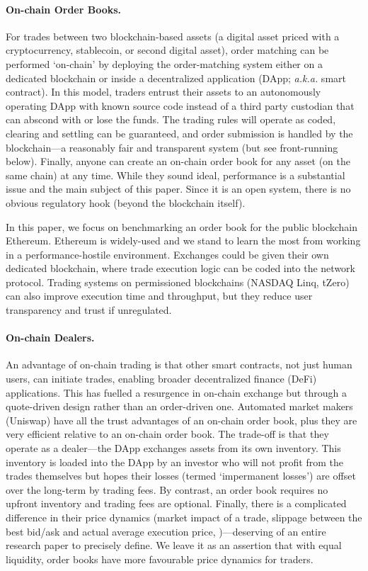 \paragraph{On-chain Order Books.} For trades between two blockchain-based assets (\eg a digital asset priced with a cryptocurrency, stablecoin, or second digital asset), order matching can be performed `on-chain' by deploying the order-matching system either on a dedicated blockchain or inside a decentralized application (DApp; \textit{a.k.a.} smart contract). In this model, traders entrust their assets to an autonomously operating DApp with known source code instead of a third party custodian that can abscond with or lose the funds. The trading rules will operate as coded, clearing and settling can be guaranteed, and order submission is handled by the blockchain---a reasonably fair and transparent system (but see front-running below). Finally, anyone can create an on-chain order book for any asset (on the same chain) at any time. While they sound ideal, performance is a substantial issue and the main subject of this paper. Since it is an open system, there is no obvious regulatory hook (beyond the blockchain itself). 

In this paper, we focus on benchmarking an order book for the public blockchain Ethereum. Ethereum is widely-used and we stand to learn the most from working in a performance-hostile environment. Exchanges could be given their own dedicated blockchain, where trade execution logic can be coded into the network protocol. Trading systems on permissioned blockchains (\eg NASDAQ Linq, tZero) can also improve execution time and throughput, but they reduce user transparency and trust if unregulated.

\paragraph{On-chain Dealers.} An advantage of on-chain trading is that other smart contracts, not just human users, can initiate trades, enabling broader decentralized finance (DeFi) applications. This has fuelled a resurgence in on-chain exchange but through a quote-driven design rather than an order-driven one. Automated market makers  (\eg Uniswap) have all the trust advantages of an on-chain order book, plus they are very efficient relative to an on-chain order book. The trade-off is that they operate as a dealer---the DApp exchanges assets from its own inventory. This inventory is loaded into the DApp by an investor who will not profit from the trades themselves but hopes their losses (termed `impermanent losses') are offset over the long-term by trading fees. By contrast, an order book requires no upfront inventory and trading fees are optional. Finally, there is a complicated difference in their price dynamics (\eg market impact of a trade, slippage between the best bid/ask and actual average execution price, \etc)---deserving of an entire research paper to precisely define. We leave it as an assertion that with equal liquidity, order books have more favourable price dynamics for traders.

